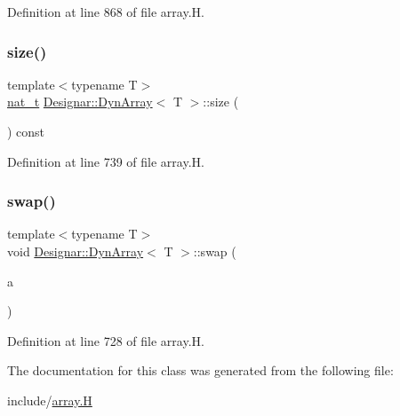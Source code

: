 Definition at line 868 of file array.\+H.

\mbox{\label{class_designar_1_1_dyn_array_a7261fdb2ace9cdefbacb49d06c2f919d}} 
\subsubsection{\texorpdfstring{size()}{size()}}
{\footnotesize\ttfamily template$<$typename T$>$ \\
\hyperlink{namespace_designar_aa72662848b9f4815e7bf31a7cf3e33d1}{nat\+\_\+t} \hyperlink{class_designar_1_1_dyn_array}{Designar\+::\+Dyn\+Array}$<$ T $>$\+::size (\begin{DoxyParamCaption}{ }\end{DoxyParamCaption}) const\hspace{0.3cm}{\ttfamily [inline]}}



Definition at line 739 of file array.\+H.

\mbox{\label{class_designar_1_1_dyn_array_a70d4d7e34ed05280f849adb6aa20180d}} 
\subsubsection{\texorpdfstring{swap()}{swap()}}
{\footnotesize\ttfamily template$<$typename T$>$ \\
void \hyperlink{class_designar_1_1_dyn_array}{Designar\+::\+Dyn\+Array}$<$ T $>$\+::swap (\begin{DoxyParamCaption}\item[{\hyperlink{class_designar_1_1_dyn_array}{Dyn\+Array}$<$ T $>$ \&}]{a }\end{DoxyParamCaption})\hspace{0.3cm}{\ttfamily [inline]}}



Definition at line 728 of file array.\+H.



The documentation for this class was generated from the following file\+:\begin{DoxyCompactItemize}
\item 
include/\hyperlink{array_8_h}{array.\+H}\end{DoxyCompactItemize}
